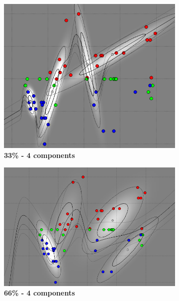 \begin{figure}[!ht]
\centering
\begin{subfigure}[h]{0.3\textwidth}
\centering
\includegraphics[height=0.08\textheight]{./regression/full_cov_kmeans_4_mixture_33train.png}
\caption{\bf 33\% - 4 components}
\end{subfigure}
\begin{subfigure}[h]{0.3\textwidth}
\centering
\includegraphics[height=0.08\textheight]{./regression/full_cov_kmeans_4_mixture_66train.png}
\caption{\bf 66\% - 4 components}
\end{subfigure}
\begin{subfigure}[h]{0.3\textwidth}
\centering

\end{subfigure}
\end{figure}
